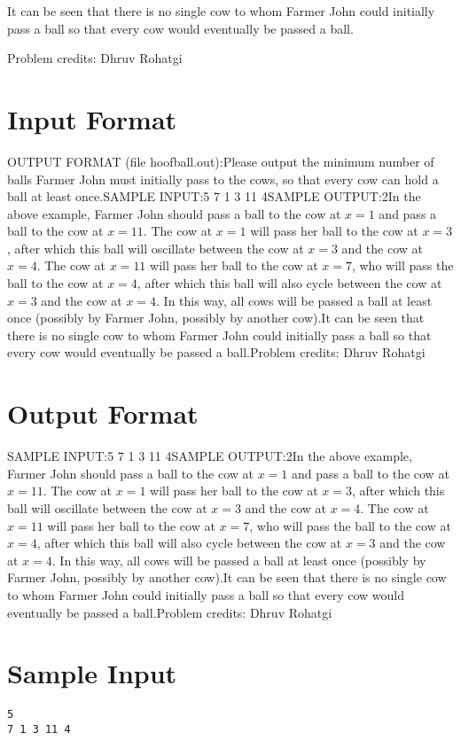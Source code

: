 \documentclass[12pt]{article}
\begin{document}
It can be seen that there is no single cow to whom Farmer John could initially pass a ball
so that every cow would eventually be passed a ball.


Problem credits: Dhruv Rohatgi



\section*{Input Format}
OUTPUT FORMAT (file hoofball.out):Please output the minimum number of balls Farmer John must initially pass to the
cows, so that every cow can hold a ball at least once.SAMPLE INPUT:5
7 1 3 11 4SAMPLE OUTPUT:2In the above example, Farmer John should pass a ball to the cow at $x=1$ and
pass a ball to the cow at $x=11$. The cow at $x=1$ will pass her ball to the cow
at $x=3$, after which this ball will oscillate between the cow at $x=3$ and the
cow at $x=4$. The cow at $x=11$ will pass her ball to the cow at $x=7$, who will
pass the ball to the cow at $x=4$, after which this ball will also cycle between
the cow at $x=3$ and the cow at $x=4$. In this way, all cows will be passed a
ball at least once (possibly by Farmer John, possibly by another cow).It can be seen that there is no single cow to whom Farmer John could initially pass a ball
so that every cow would eventually be passed a ball.Problem credits: Dhruv Rohatgi

\section*{Output Format}
SAMPLE INPUT:5
7 1 3 11 4SAMPLE OUTPUT:2In the above example, Farmer John should pass a ball to the cow at $x=1$ and
pass a ball to the cow at $x=11$. The cow at $x=1$ will pass her ball to the cow
at $x=3$, after which this ball will oscillate between the cow at $x=3$ and the
cow at $x=4$. The cow at $x=11$ will pass her ball to the cow at $x=7$, who will
pass the ball to the cow at $x=4$, after which this ball will also cycle between
the cow at $x=3$ and the cow at $x=4$. In this way, all cows will be passed a
ball at least once (possibly by Farmer John, possibly by another cow).It can be seen that there is no single cow to whom Farmer John could initially pass a ball
so that every cow would eventually be passed a ball.Problem credits: Dhruv Rohatgi

\section*{Sample Input}
\begin{verbatim}
5
7 1 3 11 4
\end{verbatim}
\end{document}
